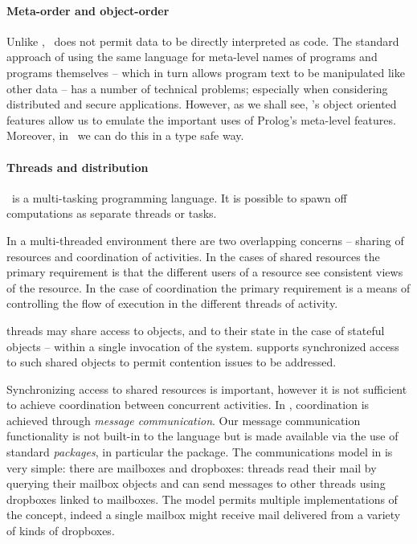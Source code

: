 \paragraph{Meta-order and object-order}
Unlike \prolog, \go\ does not permit data to be directly interpreted as code. The standard \prolog approach of using the same language for meta-level names of programs and programs themselves -- which in turn allows program text to be manipulated like other data -- has a number of technical problems; especially when considering distributed and secure applications.  However, as we shall see, \go's object oriented features allow us to emulate the important uses of Prolog's meta-level features. Moreover, in \go\ we can do this in a type safe way.

\paragraph{Threads and distribution}
\go\ is a multi-tasking programming language. It is possible to spawn off computations as separate threads or tasks.

In a multi-threaded environment there are two overlapping concerns -- sharing of resources and coordination of activities. In the cases of shared resources the primary requirement is that the different users of a resource see consistent views of the resource. In the case of coordination the primary requirement is a means of controlling the flow of execution in the different threads of activity.

\go threads may share access to objects, and to their state in the case of stateful objects -- within a single invocation of the system. \go supports synchronized access to such shared objects to permit contention issues to be addressed.

Synchronizing access to shared resources is important, however it is not sufficient to achieve coordination between concurrent activities. In \go, coordination is achieved through \emph{message communication}. Our message communication functionality is not built-in to the language but is made available via the use of standard \emph{packages}, in particular the  package. The communications model in  is very simple: there are mailboxes and dropboxes: threads read their mail by querying their mailbox objects and can send messages to other threads using dropboxes linked to mailboxes. The model permits multiple implementations of the concept, indeed a single mailbox might receive mail delivered from a variety of kinds of dropboxes.

